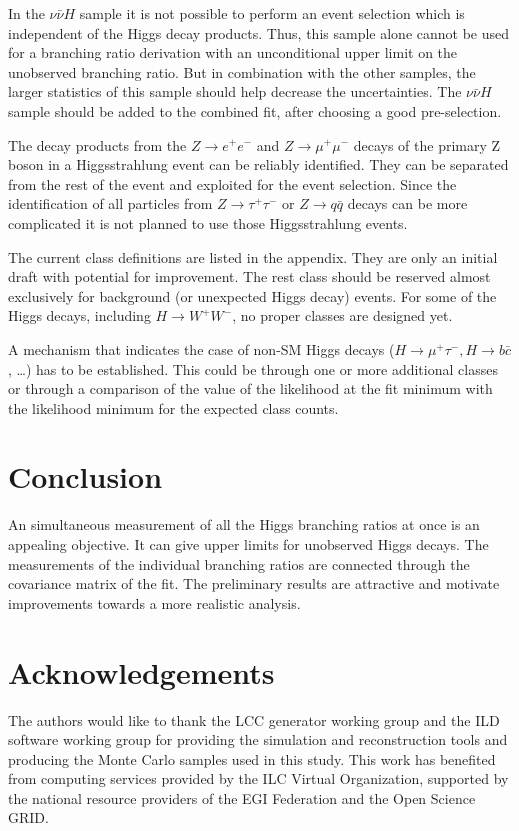 \documentclass[11pt, hidelinks, a4paper]{scrartcl}
\begin{document}
In the $\nu \bar{\nu} H$ sample it is not possible to
perform an event selection which is independent of the Higgs decay products.
Thus, this sample alone cannot be used for a branching ratio derivation with
an unconditional upper limit on the unobserved branching ratio.
But in combination with the other samples, the larger statistics of this
sample should help decrease the uncertainties.
The $\nu \bar{\nu} H$ sample should be added to the combined fit,
after choosing a good pre-selection.

The decay products from the  $Z \to e^+ e^-$ and $Z \to \mu^+ \mu^-$ decays
of the primary Z boson in a Higgsstrahlung event can be reliably identified.
They can be separated from the rest of the event
and exploited for the event selection.
Since the identification of all particles from
$Z \to \tau^+ \tau^-$ or $Z \to q \bar{q}$ decays
can be more complicated
it is not planned to use those Higgsstrahlung events.

The current class definitions are listed in the appendix.
They are only an initial draft with potential for improvement.
The rest class should be reserved almost exclusively for
background (or unexpected Higgs decay) events.
For some of the Higgs decays, including $H \to W^+ W^-$,
no proper classes are designed yet.

A mechanism that indicates the case of non-SM Higgs decays
($H \to \mu^+\tau^-, H \to b\bar{c}$, \ldots)
has to be established.
This could be through one or more additional classes
or through a comparison of the value of the likelihood at the fit minimum
with the likelihood minimum for the expected class counts.

\section{Conclusion}\label{sec:conclusion}
An simultaneous measurement of all the Higgs branching ratios at once is
an appealing objective.
It can give upper limits for unobserved Higgs decays.
The measurements of the individual branching ratios are
connected through the covariance matrix of the fit.
The preliminary results are attractive and motivate
improvements towards a more realistic analysis.

\section*{Acknowledgements}
The authors would like to thank the LCC generator working group and the ILD software working
group for providing the simulation and reconstruction tools and producing the Monte Carlo
samples used in this study. This work has benefited from computing services provided by
the ILC Virtual Organization, supported by the national resource providers of the EGI
Federation and the Open Science GRID.
\end{document}
